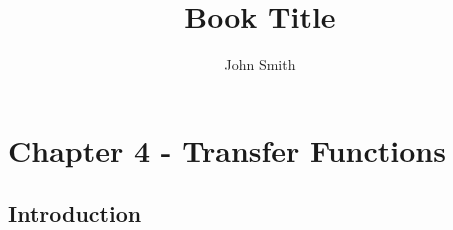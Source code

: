 \documentclass{tufte-book} %
\title{Book Title} %
\author{John Smith} %
\begin{document}
\frontmatter



\mainmatter


\chapter{Chapter 4 - Transfer Functions}
\label{ch:1}


\section{Introduction}
\end{document}
